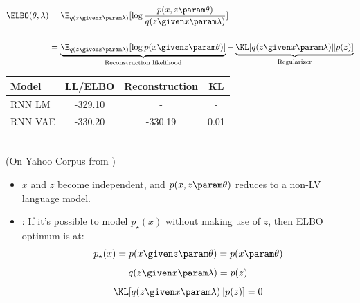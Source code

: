 
\begin{frame}

\begin{eqnarray*} 
\ELBO(\theta, \lambda) &= \displaystyle \E_{q(z \given x \param \lambda)}[\log \frac{p( x, z \param \theta)}{ q(z \given x \param \lambda)}] \\\\
&= \underbrace{\E_{q(z \given x \param \lambda)}[\log p( x \given z \param \theta)]
}_{\text{Reconstruction likelihood}} - \underbrace{\KL[q(z \given x \param \lambda) \Vert p(z)]}_{\text{Regularizer}} 
\end{eqnarray*}
\center

\vspace{5mm}
\begin{tabular}{l c c c }
\toprule
     Model & LL/ELBO & Reconstruction & KL \\
\midrule     
     RNN LM & -329.10 & - & - \\
     RNN VAE & -330.20 & -330.19 & 0.01 \\
\bottomrule
\end{tabular} \\
\vspace{5mm}
(On Yahoo Corpus from \cite{Yang2017}) \\
\end{frame} 

\begin{frame}
\begin{itemize}

  \item $x$ and $z$ become independent, and $p(x, z \param \theta)$
    reduces to a non-LV language model.    
    
    \air
    \item \citet{Chen2017}: If it's possible to model $p_\star(x)$ without making use of $z$, then ELBO optimum is at:    
    \[ p_\star(x) = p(x \given z \param \theta) = p(x \param \theta) \]
    \[ q(z \given x \param \lambda) = p(z) \]
    \[ \KL[q(z \given x \param \lambda) \Vert p(z)] = 0\] 
\end{itemize}
\end{frame} 

